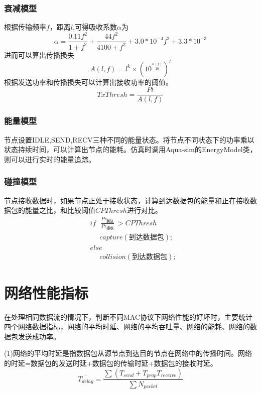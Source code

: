 \subsubsection{衰减模型}
根据传输频率$f$，距离$l$,可得吸收系数$\alpha$为\cite{xie2009aqua}
\begin{equation}
\alpha=\frac{0.11f^2}{1+f^2}+\frac{44f^2}{4100+f^2}+3.0*10^{-4}f^2+3.3*10^{-3}
\end{equation}
进而可以算出传播损失\cite{xie2009aqua}
\begin{equation}
A(l,f)=l^k\times(10^{\frac{\alpha (f)}{10}})^l
\end{equation}
根据发送功率和传播损失可以计算出接收功率的阈值。
\begin{equation}
TxThresh=\frac{Pt}{A(l,f)}
\end{equation}

\subsubsection{能量模型}
节点设置IDLE,SEND,RECV三种不同的能量状态。将节点不同状态下的功率乘以状态持续时间，可以计算出节点的能耗。仿真时调用Aqua-sim的EnergyModel类，则可以进行实时的能量追踪。

\subsubsection{碰撞模型}
节点接收数据时，如果节点正处于接收状态，计算到达数据包的能量和正在接收数据包的能量之比，和比较阈值$CPThresh$进行对比。
\begin{equation}
\begin{aligned}
&if \ \ \  \frac{Pr_{\mbox{到达}}}{Pr_{\mbox{接收}}}\  > CPThresh\\
&\ \ \ \ \ \ capture(\mbox{到达数据包});\\
&else\\
&\ \ \ \ \ \ collision(\mbox{到达数据包});
\end{aligned}
\end{equation}

\section{网络性能指标}
在处理相同数据流的情况下，判断不同MAC协议下网络性能的好坏时，主要统计四个网络数据指标，网络的平均时延、网络的平均吞吐量、网络的能耗、网络的数据包发送成功率。

(1)网络的平均时延是指数据包从源节点到达目的节点在网络中的传播时间。网络的时延=数据包的发送时延+数据包的传输时延+数据包的接收时延。 
\begin{equation}
\overline{T_{delay}}=\frac {\sum (T_{send}+T_{prop}T_{receive})}{\sum {N_{packet}}}
\end{equation}

